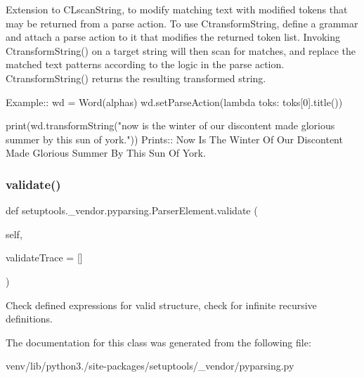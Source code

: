 \begin{DoxyVerb}Extension to C{L{scanString}}, to modify matching text with modified tokens that may
be returned from a parse action.  To use C{transformString}, define a grammar and
attach a parse action to it that modifies the returned token list.
Invoking C{transformString()} on a target string will then scan for matches,
and replace the matched text patterns according to the logic in the parse
action.  C{transformString()} returns the resulting transformed string.

Example::
    wd = Word(alphas)
    wd.setParseAction(lambda toks: toks[0].title())
    
    print(wd.transformString("now is the winter of our discontent made glorious summer by this sun of york."))
Prints::
    Now Is The Winter Of Our Discontent Made Glorious Summer By This Sun Of York.
\end{DoxyVerb}
 \mbox{\label{classsetuptools_1_1__vendor_1_1pyparsing_1_1_parser_element_ad3e1e503c2a2e6bbece407e4e6b68651}} 
\subsubsection{\texorpdfstring{validate()}{validate()}}
{\footnotesize\ttfamily def setuptools.\+\_\+vendor.\+pyparsing.\+Parser\+Element.\+validate (\begin{DoxyParamCaption}\item[{}]{self,  }\item[{}]{validate\+Trace = {\ttfamily \mbox{[}\mbox{]}} }\end{DoxyParamCaption})}

\begin{DoxyVerb}Check defined expressions for valid structure, check for infinite recursive definitions.
\end{DoxyVerb}
 

The documentation for this class was generated from the following file\+:\begin{DoxyCompactItemize}
\item 
venv/lib/python3./site-\/packages/setuptools/\+\_\+vendor/pyparsing.\+py\end{DoxyCompactItemize}
